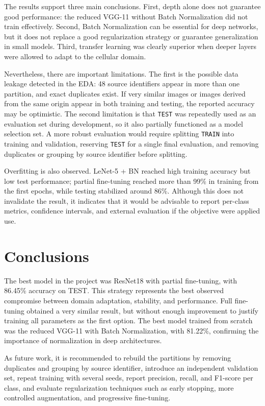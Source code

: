 \documentclass[11pt,a4paper]{article}
\begin{document}
The results support three main conclusions. First, depth alone does not guarantee good performance: the reduced VGG-11 without Batch Normalization did not train effectively. Second, Batch Normalization can be essential for deep networks, but it does not replace a good regularization strategy or guarantee generalization in small models. Third, transfer learning was clearly superior when deeper layers were allowed to adapt to the cellular domain.

Nevertheless, there are important limitations. The first is the possible data leakage detected in the EDA: 48 source identifiers appear in more than one partition, and exact duplicates exist. If very similar images or images derived from the same origin appear in both training and testing, the reported accuracy may be optimistic. The second limitation is that \texttt{TEST} was repeatedly used as an evaluation set during development, so it also partially functioned as a model selection set. A more robust evaluation would require splitting \texttt{TRAIN} into training and validation, reserving \texttt{TEST} for a single final evaluation, and removing duplicates or grouping by source identifier before splitting.

Overfitting is also observed. LeNet-5 + BN reached high training accuracy but low test performance; partial fine-tuning reached more than 99\% in training from the first epochs, while testing stabilized around 86\%. Although this does not invalidate the result, it indicates that it would be advisable to report per-class metrics, confidence intervals, and external evaluation if the objective were applied use.

\section{Conclusions}

The best model in the project was ResNet18 with partial fine-tuning, with 86.45\% accuracy on TEST. This strategy represents the best observed compromise between domain adaptation, stability, and performance. Full fine-tuning obtained a very similar result, but without enough improvement to justify training all parameters as the first option. The best model trained from scratch was the reduced VGG-11 with Batch Normalization, with 81.22\%, confirming the importance of normalization in deep architectures.

As future work, it is recommended to rebuild the partitions by removing duplicates and grouping by source identifier, introduce an independent validation set, repeat training with several seeds, report precision, recall, and F1-score per class, and evaluate regularization techniques such as early stopping, more controlled augmentation, and progressive fine-tuning.
\end{document}
